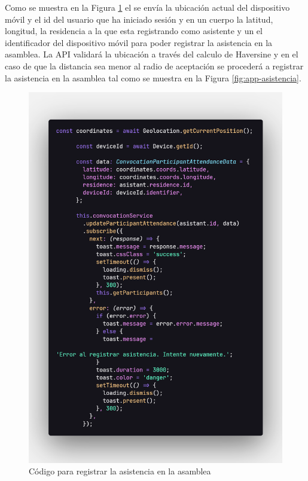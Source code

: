 Como se muestra en la Figura \ref{fig:app-asistencia-codigo} el se envía la ubicación actual del dispositivo móvil y el id del usuario que ha iniciado sesión y en un cuerpo la latitud, longitud, la residencia a la que esta registrando como asistente y un el identificador del dispositivo móvil para poder registrar la asistencia en la asamblea.
La API validará la ubicación a través del calculo de Haversine y en el caso de que la distancia sea menor al radio de aceptación se procederá a registrar la asistencia en la asamblea tal como se muestra en la Figura \ref{fig:app-asistencia}.

\begin{figure}[H]
    \centering
    \includegraphics[width=1\textwidth]{resources/images/app-asistencia-codigo}
    \caption{Código para registrar la asistencia en la asamblea}
    \label{fig:app-asistencia-codigo}
\end{figure}

